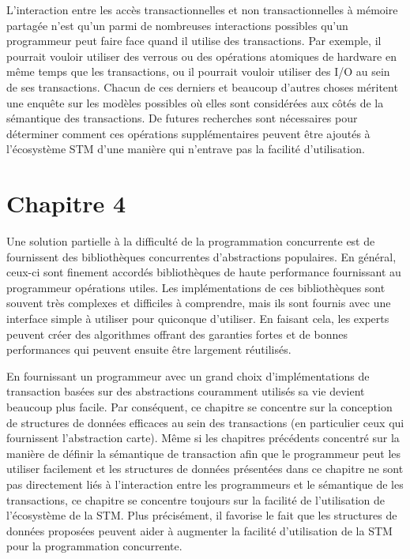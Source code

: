 L'interaction entre les accès transactionnelles et non transactionnelles à mémoire partagée n'est qu'un parmi de nombreuses interactions possibles qu'un programmeur peut faire face quand il utilise des transactions.
Par exemple, il pourrait vouloir utiliser des verrous ou des opérations atomiques de hardware en même temps que les transactions, ou il pourrait vouloir utiliser des I/O au sein de ses transactions.
Chacun de ces derniers et beaucoup d'autres choses méritent une enquête sur les modèles possibles où elles sont considérées aux côtés de la sémantique des transactions.
De futures recherches sont nécessaires pour déterminer comment ces opérations supplémentaires peuvent être ajoutés à l'écosystème STM d'une manière qui n'entrave pas la facilité d'utilisation.



\section{Chapitre 4}
Une solution partielle à la difficulté de la programmation concurrente est de fournissent des bibliothèques concurrentes d'abstractions populaires.
En général, ceux-ci sont finement accordés bibliothèques de haute performance fournissant au programmeur opérations utiles.
Les implémentations de ces bibliothèques sont souvent très complexes et difficiles à comprendre, mais ils sont fournis avec une interface simple à utiliser pour quiconque d'utiliser.
En faisant cela, les experts peuvent créer des algorithmes offrant des garanties fortes et de bonnes performances qui peuvent ensuite être largement réutilisés.


En fournissant un programmeur avec un grand choix d'implémentations de transaction basées sur des abstractions couramment utilisés sa vie devient beaucoup plus facile.
Par conséquent, ce chapitre se concentre sur la conception de structures de données efficaces au sein des transactions (en particulier ceux qui fournissent l'abstraction carte).
Même si les chapitres précédents concentré sur la manière de définir la sémantique de transaction afin que le programmeur peut les
utiliser facilement et les structures de données présentées dans ce chapitre ne sont pas directement liés à l'interaction entre les programmeurs et le sémantique de les transactions,
ce chapitre se concentre toujours sur la facilité de l'utilisation de l'écosystème de la STM.
Plus précisément, il favorise le fait que les structures de données proposées peuvent aider à augmenter la facilité d'utilisation de la STM pour la programmation concurrente.




